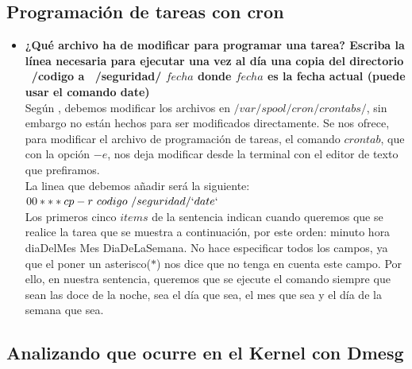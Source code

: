 \subsection{Programación de tareas con cron}
\begin{itemize}
	\item \textbf{¿Qué archivo ha de modificar para programar una tarea? Escriba la línea
		necesaria para ejecutar una vez al día una copia del directorio ~/codigo a ~/seguridad/
		$fecha$ donde $fecha$ es la fecha actual (puede usar el comando date)}\\
	Según \cite{crontab}, debemos modificar los archivos en $/var/spool/cron/crontabs/$, sin embargo no están hechos para ser modificados directamente. Se nos ofrece, para modificar el archivo de programación de tareas, el comando $crontab$, que con la opción $-e$, nos deja modificar desde la terminal con el editor de texto que prefiramos.\\
	
	La linea que debemos añadir será la siguiente:\\
	
	$0 0 * * * cp -r ~codigo ~/seguridad/`date`$\\
	
	Los primeros cinco $items$ de la sentencia indican cuando queremos que se realice la tarea que se muestra a continuación, por este orden: minuto hora diaDelMes Mes DiaDeLaSemana. No hace especificar todos los campos, ya que el poner un asterisco($*$) nos dice que no tenga en cuenta este campo. Por ello, en nuestra sentencia, queremos que se ejecute el comando siempre que sean las doce de la noche, sea el día que sea, el mes que sea y el día de la semana que sea.
\end{itemize}

\subsection{Analizando que ocurre en el Kernel con Dmesg}


